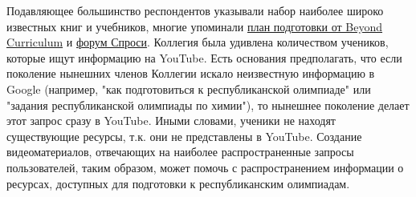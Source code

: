 Подавляющее большинство респондентов указывали набор наиболее широко известных книг и учебников, многие упоминали \href{https://olympiads.bc-pf.org}{план подготовки от Beyond Curriculum} и \href{https://ask.bc-pf.org/}{форум Спроси}. Коллегия была удивлена количеством учеников, которые ищут информацию на YouTube. Есть основания предполагать, что если поколение нынешних членов Коллегии искало неизвестную информацию в Google (например, "как подготовиться к республиканской олимпиаде" или "задания республиканской олимпиады по химии"), то нынешнее поколение делает этот запрос сразу в YouTube. Иными словами, ученики не находят существующие ресурсы, т.к. они не представлены в YouTube. Создание видеоматериалов, отвечающих на наиболее распространенные запросы пользователей, таким образом, может помочь с распространением информации о ресурсах, доступных для подготовки к республиканским олимпиадам.